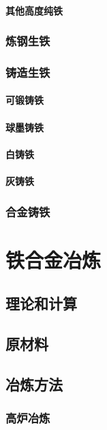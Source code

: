 \documentclass[UTF8]{../../ApplicationUniverse}
\begin{document}
        \subsubsection{其他高度纯铁}
    \subsection{炼钢生铁}
    \subsection{铸造生铁}
        \subsubsection{可锻铸铁}
        \subsubsection{球墨铸铁}
        \subsubsection{白铸铁}
        \subsubsection{灰铸铁}
    \subsection{合金铸铁}









\chapter{铁合金冶炼}
\section{理论和计算}
\section{原材料}
\section{冶炼方法}
    \subsection{高炉冶炼}
\end{document}
